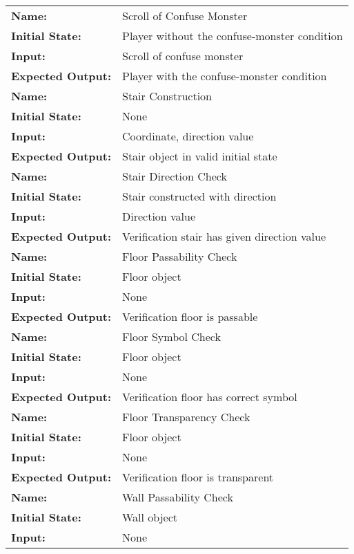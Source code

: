 \documentclass[12pt, titlepage]{article}
\begin{document}
\begin{center}
\begin{longtable}{ l | p{10cm} }
				\hline
				\rule{0pt}{2em}\textbf{Name:} & Scroll of Confuse Monster\\
				\textbf{Initial State:} & Player without the confuse-monster condition\\
				\textbf{Input:} & Scroll of confuse monster\\
				\textbf{Expected Output:} & Player with the confuse-monster condition\\[1em]
				\hline
				\rule{0pt}{2em}\textbf{Name:} & Stair Construction\\
				\textbf{Initial State:} & None\\
				\textbf{Input:} & Coordinate, direction value\\
				\textbf{Expected Output:} & Stair object in valid initial state\\[1em]
				\hline
				\rule{0pt}{2em}\textbf{Name:} & Stair Direction Check\\
				\textbf{Initial State:} & Stair constructed with direction\\
				\textbf{Input:} & Direction value\\
				\textbf{Expected Output:} & Verification stair has given direction value\\[1em]
				\hline
				\rule{0pt}{2em}\textbf{Name:} & Floor Passability Check\\
				\textbf{Initial State:} & Floor object\\
				\textbf{Input:} & None\\
				\textbf{Expected Output:} & Verification floor is passable\\[1em]
				\hline
				\rule{0pt}{2em}\textbf{Name:} & Floor Symbol Check\\
				\textbf{Initial State:} & Floor object\\
				\textbf{Input:} & None\\
				\textbf{Expected Output:} & Verification floor has correct symbol\\[1em]
				\hline
				\rule{0pt}{2em}\textbf{Name:} & Floor Transparency Check\\
				\textbf{Initial State:} & Floor object\\
				\textbf{Input:} & None\\
				\textbf{Expected Output:} & Verification floor is transparent\\[1em]
				\hline
				\rule{0pt}{2em}\textbf{Name:} & Wall Passability Check\\
				\textbf{Initial State:} & Wall object\\
				\textbf{Input:} & None\\

\end{longtable}
\end{center}
\end{document}
